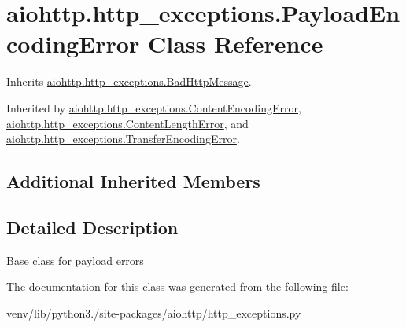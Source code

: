 \hypertarget{classaiohttp_1_1http__exceptions_1_1_payload_encoding_error}{}\section{aiohttp.\+http\+\_\+exceptions.\+Payload\+Encoding\+Error Class Reference}
\label{classaiohttp_1_1http__exceptions_1_1_payload_encoding_error}


Inherits \hyperlink{classaiohttp_1_1http__exceptions_1_1_bad_http_message}{aiohttp.\+http\+\_\+exceptions.\+Bad\+Http\+Message}.



Inherited by \hyperlink{classaiohttp_1_1http__exceptions_1_1_content_encoding_error}{aiohttp.\+http\+\_\+exceptions.\+Content\+Encoding\+Error}, \hyperlink{classaiohttp_1_1http__exceptions_1_1_content_length_error}{aiohttp.\+http\+\_\+exceptions.\+Content\+Length\+Error}, and \hyperlink{classaiohttp_1_1http__exceptions_1_1_transfer_encoding_error}{aiohttp.\+http\+\_\+exceptions.\+Transfer\+Encoding\+Error}.

\subsection*{Additional Inherited Members}


\subsection{Detailed Description}
\begin{DoxyVerb}Base class for payload errors\end{DoxyVerb}
 

The documentation for this class was generated from the following file\+:\begin{DoxyCompactItemize}
\item 
venv/lib/python3./site-\/packages/aiohttp/http\+\_\+exceptions.\+py\end{DoxyCompactItemize}

